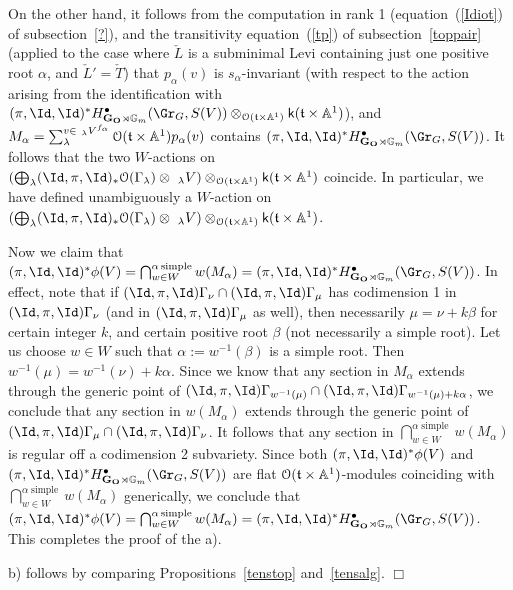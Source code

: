 \documentclass[11pt]{amsart}
\theoremstyle{definition}
\theoremstyle{remark}
\renewcommand{\O}{{\mathcal O}}
\theoremstyle{remark}
\newcommand{\cal}{\mathcal}
\newcommand{\<}{\langle}
\renewcommand{\>}{\rangle}
\renewcommand{\t}{{\frak t}}
\newcommand{\LL}{\check{L}{}}
\newcommand{\LT}{\check{T}{}}
\renewcommand{\O}{{\cal O}}
\newcommand{\GO}{{\bf G_O}}
\newcommand{\Aone}{{\mathbb A}^1}
\newcommand{\Gm}{{{\mathbb G}_m}}
\newcommand{\kk}{\mathsf k}
\begin{document}
On the other hand, it follows from the computation in rank 1 
(equation~(\ref{Idiot}) of subsection~\ref{?}),
and the transitivity equation~(\ref{tp}) of subsection~\ref{toppair}
(applied to the case where $\LL$ is a subminimal Levi containing just one
positive root $\alpha$, and $\LL'=\LT$) 
that $p_\alpha(v)$ is $s_\alpha$-invariant
(with respect to the action arising from the identification with
$(\pi,\Id,\Id)^*H^\bullet_{\GO\rtimes\Gm}(\Gr_G,S(V))
\otimes_{\O(\t\times\Aone)}\kk(\t\times\Aone)$),
and $M_\alpha=
\sum_\lambda^{v\in\ _\lambda V^{f_\alpha}}\O(\t\times\Aone)p_\alpha(v)$
contains $(\pi,\Id,\Id)^*H^\bullet_{\GO\rtimes\Gm}(\Gr_G,S(V))$. 
It follows that the two $W$-actions on
$\left(\bigoplus_\lambda(\Id,\pi,\Id)_*\O(\Gamma_\lambda)\otimes\ _\lambda V
\right)\otimes_{\O(\t\times\Aone)}\kk(\t\times\Aone)$ coincide.
In particular, we have defined unambiguously a $W$-action on
$\left(\bigoplus_\lambda(\Id,\pi,\Id)_*\O(\Gamma_\lambda)\otimes\ _\lambda V
\right)\otimes_{\O(\t\times\Aone)}\kk(\t\times\Aone)$.

Now we claim that $(\pi,\Id,\Id)^*\phi(V)=
\bigcap_{w\in W}^{\alpha\operatorname{simple}}w(M_\alpha)=
(\pi,\Id,\Id)^*H^\bullet_{\GO\rtimes\Gm}(\Gr_G,S(V))$. In effect, 
note that if $(\Id,\pi,\Id)\Gamma_\nu\cap(\Id,\pi,\Id)\Gamma_\mu$
has codimension 1 in $(\Id,\pi,\Id)\Gamma_\nu$ (and in
$(\Id,\pi,\Id)\Gamma_\mu$ as well), then necessarily $\mu=\nu+k\beta$
for certain integer $k$, and certain positive root $\beta$ (not necessarily
a simple root). Let us choose $w\in W$ such that $\alpha:=w^{-1}(\beta)$
is a simple root. Then $w^{-1}(\mu)=w^{-1}(\nu)+k\alpha$.
Since we know that any section in $M_\alpha$ extends through the generic
point of $(\Id,\pi,\Id)\Gamma_{w^{-1}(\mu)}\cap(\Id,\pi,\Id)
\Gamma_{w^{-1}(\mu)+k\alpha}$, we conclude that any section in
$w(M_\alpha)$ extends through the generic point of 
$(\Id,\pi,\Id)\Gamma_\mu\cap(\Id,\pi,\Id)\Gamma_\nu$.
It follows that any section in 
$\bigcap_{w\in W}^{\alpha\operatorname{simple}}w(M_\alpha)$ is regular
off a codimension 2 subvariety. Since both $(\pi,\Id,\Id)^*\phi(V)$ and
$(\pi,\Id,\Id)^*H^\bullet_{\GO\rtimes\Gm}(\Gr_G,S(V))$ are flat
$\O(\t\times\Aone)$-modules coinciding with 
$\bigcap_{w\in W}^{\alpha\operatorname{simple}}w(M_\alpha)$
generically, we conclude that 
$(\pi,\Id,\Id)^*\phi(V)=
\bigcap_{w\in W}^{\alpha\operatorname{simple}}w(M_\alpha)=
(\pi,\Id,\Id)^*H^\bullet_{\GO\rtimes\Gm}(\Gr_G,S(V))$.
This completes the proof of the a).

b) follows by comparing Propositions~\ref{tenstop} and~\ref{tensalg}.
\hfill $\Box$
\end{document}
